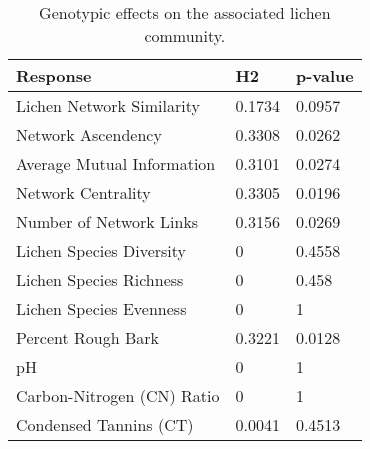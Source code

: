 \begin{table}[ht]
\centering
\begin{tabular}{lll}
  \hline
Response & H2 & p-value \\ 
  \hline
Lichen Network Similarity & 0.1734 & 0.0957 \\ 
  Network Ascendency & 0.3308 & 0.0262 \\ 
  Average Mutual Information & 0.3101 & 0.0274 \\ 
  Network Centrality & 0.3305 & 0.0196 \\ 
  Number of Network Links & 0.3156 & 0.0269 \\ 
  Lichen Species Diversity & 0 & 0.4558 \\ 
  Lichen Species Richness & 0 & 0.458 \\ 
  Lichen Species Evenness & 0 & 1 \\ 
  Percent Rough Bark & 0.3221 & 0.0128 \\ 
  pH & 0 & 1 \\ 
  Carbon-Nitrogen (CN) Ratio & 0 & 1 \\ 
  Condensed Tannins (CT) & 0.0041 & 0.4513 \\ 
   \hline
\end{tabular}
\caption{Genotypic effects on the associated lichen community.} 
\label{tab:h2_table}
\end{table}
